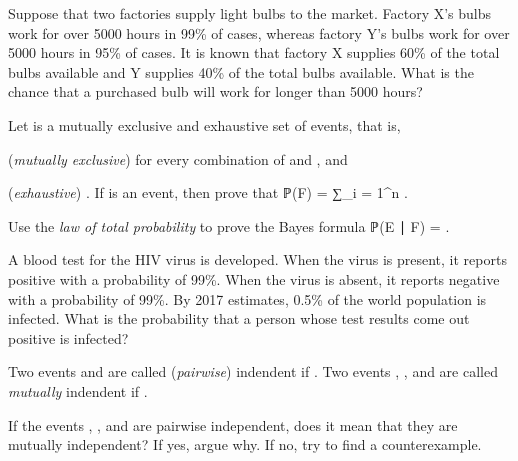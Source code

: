 	\stopsection


	\page


	\startsection [title={2019-06-26}]
		
		\startexercise [title={Bulb factory}]
			Suppose that two factories supply light bulbs to the market. Factory X's bulbs work for over 5000 hours in 99\% of cases, whereas factory Y's bulbs work for over 5000 hours in 95\% of cases. It is known that factory X supplies 60\% of the total bulbs available and Y supplies 40\% of the total bulbs available. What is the chance that a purchased bulb will work for longer than 5000 hours?
		\stopexercise

		\startexercise [title={Law of total probability}]
			Let  is a mutually exclusive and exhaustive set of events, that is,
			\startitemize [1, joinedup]
				\item  (\emph{mutually exclusive})   for every combination of  and , and
				\item  (\emph{exhaustive})  .
			\stopitemize
			If  is an event, then prove that
			\startformula
				ℙ(F)  =  ∑_{i = 1}^n \bsqr[ℙ(F ∣ E_i) ℙ(E_i)] .
			\stopformula 
		\stopexercise

		\startexercise [title={Bayes formula}]
			Use the \emph{law of total probability} to prove the Bayes formula
			\startformula
				ℙ(E ∣ F) =  .
			\stopformula
		\stopexercise

		\startexercise [title={Blood test}]
			A blood test for the HIV virus is developed.
			When the virus is present, it reports positive with a probability of 99\%.
			When the virus is absent, it reports negative with a probability of 99\%.
			By 2017 estimates, 0.5\% of the world population is infected.
			What is the probability that a person whose test results come out positive is infected?
		\stopexercise

		\startexercise [title={Mutual and pairwise independence}]
			Two events  and  are called (\emph{pairwise}) indendent if .
			Two events , , and  are called \emph{mutually} indendent if .

			If the events , , and  are pairwise independent, does it mean that they are mutually independent?
			If yes, argue why. If no, try to find a counterexample.
		\stopexercise

	\stopsection


\stopchapter